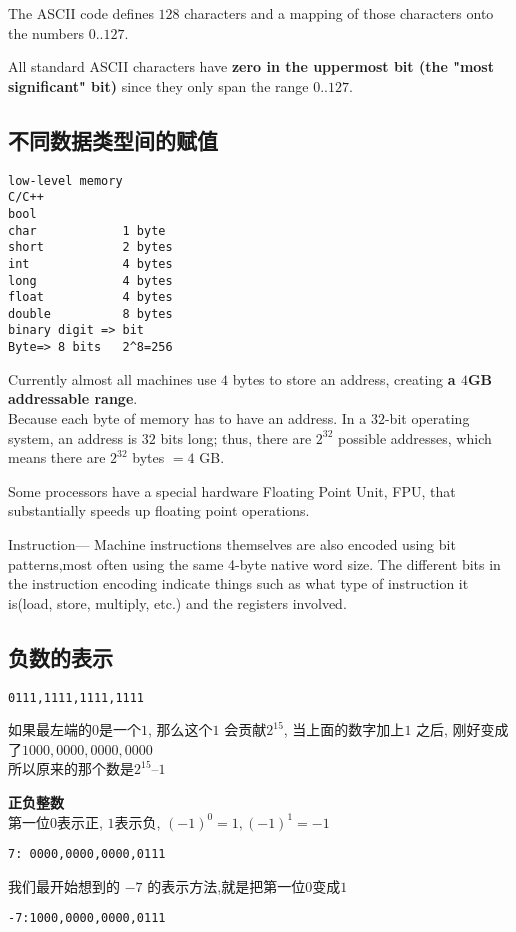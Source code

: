 \documentclass{article}
\begin{document}
The ASCII code defines $128$ characters and a mapping of those characters onto the numbers $0..127$.

All standard ASCII characters have \textbf{zero in the uppermost bit (the "most significant" bit)} since they only span the range $0..127$.

\subsection{不同数据类型间的赋值}
\begin{verbatim}
low-level memory
C/C++
bool
char            1 byte
short           2 bytes
int             4 bytes
long            4 bytes
float           4 bytes
double          8 bytes
binary digit => bit
Byte=> 8 bits   2^8=256
\end{verbatim}
Currently almost all machines use $4$ bytes to store an address, creating \textbf{a $4$GB addressable range}.\\
Because each byte of memory has to have an address. 
In a $32$-bit operating system, an address is $32$ bits long; thus, there are $2^{32}$ possible addresses, which means there are $2^{32}$ bytes $= 4$ GB.

Some processors have a special hardware Floating Point Unit, FPU, that substantially speeds up floating point operations.

Instruction— Machine instructions themselves are also encoded using bit patterns,most often using the same 4-byte native word size. 
The different bits in the instruction encoding indicate things such as what type of instruction it is(load, store, multiply, etc.) and the registers involved.

\subsection{负数的表示}
\begin{verbatim}
0111,1111,1111,1111
\end{verbatim}
如果最左端的$0$是一个$1$, 那么这个$1$ 会贡献$2^{15}$, 当上面的数字加上$1$ 之后, 刚好变成了$1000,0000,0000,0000$\\
所以原来的那个数是$2^{15} – 1$

\textbf{正负整数}\\
第一位$0$表示正, $1$表示负, $(-1)^0=1, (-1)^1 = -1$
\begin{verbatim}
7: 0000,0000,0000,0111
\end{verbatim}
我们最开始想到的 $-7$ 的表示方法,就是把第一位$0$变成$1$
\begin{verbatim}
-7:1000,0000,0000,0111
\end{verbatim}
\end{document}
